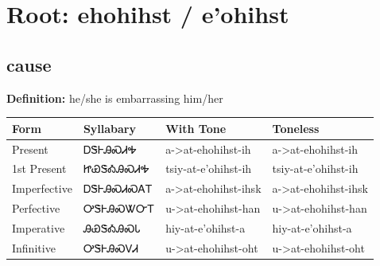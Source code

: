 \documentclass{article}%
\begin{document}
%
\normalsize%
\section*{Root: ehohihst / e'ohihst}%
\subsection*{cause}%
\textbf{Definition: }%
he/she is embarrassing him/her%
\\[0.5em]%
\begin{tabular}{|l|l|l|l|}%
\hline%
\textbf{Form}&\textbf{Syllabary}&\textbf{With Tone}&\textbf{Toneless}\\%
\hline%
Present&ᎠᏕᎰᎯᏍᏗᎭ&a{-}>at{-}ehohihst{-}ih&a{-}>at{-}ehohihst{-}ih\\%
1st Present&ᏥᏯᏕᎣᎯᏍᏗᎭ&tsiy{-}at{-}e'ohihst{-}ih&tsiy{-}at{-}e'ohihst{-}ih\\%
Imperfective&ᎠᏕᎰᎯᏍᏗᏍᎪᎢ&a{-}>at{-}ehohihst{-}ihsk&a{-}>at{-}ehohihst{-}ihsk\\%
Perfective&ᎤᏕᎰᎯᏍᏔᏅᎢ&u{-}>at{-}ehohihst{-}han&u{-}>at{-}ehohihst{-}han\\%
Imperative&ᎯᏯᏕᎣᎯᏍᏓ&hiy{-}at{-}e'ohihst{-}a&hiy{-}at{-}e'ohihst{-}a\\%
Infinitive&ᎤᏕᎰᎯᏍᏙᏗ&u{-}>at{-}ehohihst{-}oht&u{-}>at{-}ehohihst{-}oht\\%
\hline%
\end{tabular}%
\\[1em]%
\end{document}
